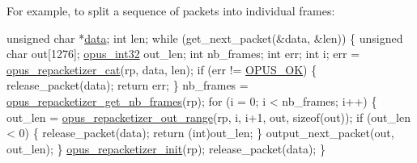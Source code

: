 For example, to split a sequence of packets into individual frames\+: 
\begin{DoxyCode}
\textcolor{keywordtype}{unsigned} \textcolor{keywordtype}{char} *\hyperlink{jpeglib_8h_aa379dc8ae39e55ae0c431a61a7d2f2bc}{data};
\textcolor{keywordtype}{int} len;
\textcolor{keywordflow}{while} (get\_next\_packet(&data, &len))
\{
  \textcolor{keywordtype}{unsigned} \textcolor{keywordtype}{char} out[1276];
  \hyperlink{opus__types_8h_aa4d309d6f80b99dbabebc8f98879ab9a}{opus\_int32} out\_len;
  \textcolor{keywordtype}{int} nb\_frames;
  \textcolor{keywordtype}{int} err;
  \textcolor{keywordtype}{int} i;
  err = \hyperlink{group__opus__repacketizer_gaa739f0bbc0ad09ad159ffb6455a6bb55}{opus\_repacketizer\_cat}(rp, data, len);
  \textcolor{keywordflow}{if} (err != \hyperlink{group__opus__errorcodes_gaa44cf8a185e1b5cb940ef63eb4f02d21}{OPUS\_OK})
  \{
    release\_packet(data);
    \textcolor{keywordflow}{return} err;
  \}
  nb\_frames = \hyperlink{group__opus__repacketizer_ga0abed93ad18e8b2bd8b5bd10189c3e97}{opus\_repacketizer\_get\_nb\_frames}(rp);
  \textcolor{keywordflow}{for} (i = 0; i < nb\_frames; i++)
  \{
    out\_len = \hyperlink{group__opus__repacketizer_gad06762a8f4032823f6b64b63e8416efc}{opus\_repacketizer\_out\_range}(rp, i, i+1, out, \textcolor{keyword}{sizeof}(out));
    \textcolor{keywordflow}{if} (out\_len < 0)
    \{
       release\_packet(data);
       \textcolor{keywordflow}{return} (\textcolor{keywordtype}{int})out\_len;
    \}
    output\_next\_packet(out, out\_len);
  \}
  \hyperlink{group__opus__repacketizer_gadef533688e80dcc96a32b955657aaf28}{opus\_repacketizer\_init}(rp);
  release\_packet(data);
\}
\end{DoxyCode}


